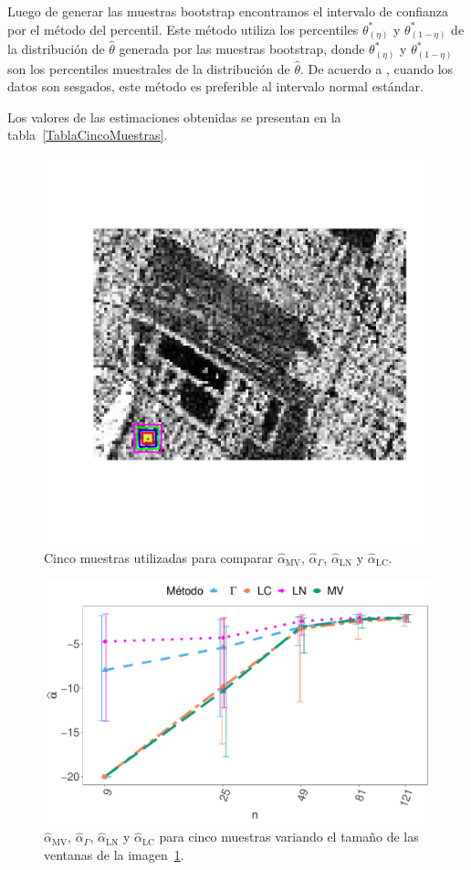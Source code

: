 Luego de generar las muestras bootstrap encontramos el intervalo de confianza por el método del percentil. Este método utiliza los percentiles $\theta^*_{(\eta)}$ y $\theta^*_{(1-\eta)}$ de la distribución de $\widehat{\theta}$ generada por las muestras bootstrap, donde $\theta^*_{(\eta)}$ y $\theta^*_{(1-\eta)}$ son los percentiles muestrales de la distribución de $\widehat{\theta}$. De acuerdo a \citet{Efron93}, cuando los datos son sesgados, este método es preferible al intervalo normal estándar.


Los valores de las estimaciones obtenidas se presentan en la tabla~\ref{TablaCincoMuestras}.
\begin{figure}[htb]
	\centering
	\includegraphics[width=0.7\linewidth]{../../Figures/Tesis/ImagenReal/CincoMuestras.pdf}
	\caption{\label{CincoMuestras}\small Cinco muestras utilizadas para comparar  $\widehat{\alpha}_{\text{MV}}$, $\widehat{\alpha}_{\Gamma}$, $\widehat{\alpha}_{\text{LN}}$ y  $\widehat{\alpha}_{\text{LC}}$.}
\end{figure}


\begin{figure}[htb]
	\centering
	\includegraphics[width=0.8\linewidth]{../../Figures/Tesis/ImagenReal/AlfaVsTamCincoMuestras_v2_0975.pdf}
	\caption{\label{AlfaVsTamCincoMuestras}\small $\widehat{\alpha}_{\text{MV}}$, $\widehat{\alpha}_{\Gamma}$, $\widehat{\alpha}_{\text{LN}}$ y  $\widehat{\alpha}_{\text{LC}}$ para cinco muestras variando el tamaño de las ventanas de la imagen~\ref{CincoMuestras}.}
\end{figure}

